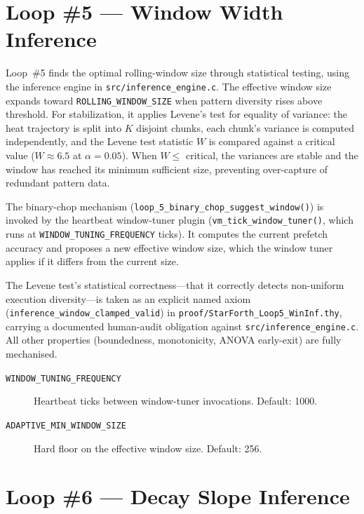 \section{Loop \#5 --- Window Width Inference}
\label{vol1:sec:physics:loop5}


Loop~\#5 finds the optimal rolling-window size through statistical testing, using
the inference engine in \texttt{src/inference\_engine.c}. The effective window
size expands toward \texttt{ROLLING\_WINDOW\_SIZE} when pattern diversity rises
above threshold. For stabilization, it applies Levene's test for equality of
variance: the heat trajectory is split into $K$ disjoint chunks, each chunk's
variance is computed independently, and the Levene test statistic $W$ is compared
against a critical value ($W \approx 6.5$ at $\alpha = 0.05$). When
$W \le$ critical, the variances are stable and the window has reached its minimum
sufficient size, preventing over-capture of redundant pattern data.

The binary-chop mechanism (\texttt{loop\_5\_binary\_chop\_suggest\_window()})
is invoked by the heartbeat window-tuner plugin
(\texttt{vm\_tick\_window\_tuner()}, which runs at
\texttt{WINDOW\_TUNING\_FREQUENCY} ticks). It computes the current prefetch
accuracy and proposes a new effective window size, which the window tuner
applies if it differs from the current size.

The Levene test's statistical correctness---that it correctly detects
non-uniform execution diversity---is taken as an explicit named axiom
(\texttt{inference\_window\_clamped\_valid}) in
\texttt{proof/StarForth\_Loop5\_WinInf.thy}, carrying a documented human-audit
obligation against \texttt{src/inference\_engine.c}. All other properties
(boundedness, monotonicity, ANOVA early-exit) are fully mechanised.

\begin{description}
  \item[\texttt{WINDOW\_TUNING\_FREQUENCY}] Heartbeat ticks between
    window-tuner invocations. Default: 1000.
  \item[\texttt{ADAPTIVE\_MIN\_WINDOW\_SIZE}] Hard floor on the effective
    window size. Default: 256.
\end{description}

\section{Loop \#6 --- Decay Slope Inference}
\label{vol1:sec:physics:loop6}


